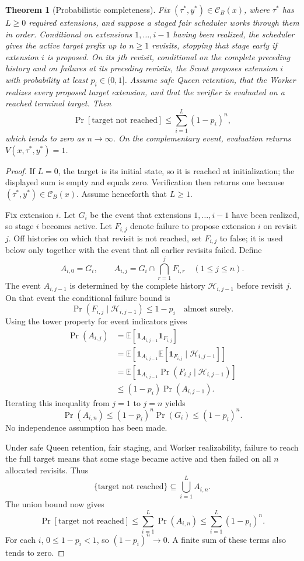 \documentclass[11pt,oneside]{book}
\newtheorem{theorem}[definition]{Theorem}
\theoremstyle{remark}
\newcommand{\cB}{\mathcal C_B}
\newcommand{\one}{\mathbf 1}
\begin{document}
\begin{theorem}[Probabilistic completeness]
Fix $(\tau^*,y^*)\in\cB(x)$, where $\tau^*$ has $L\ge0$ required
extensions, and suppose a staged fair scheduler works through them in order.
Conditional on extensions $1,\ldots,i-1$ having been realized, the scheduler
gives the active target prefix up to $n\ge1$ revisits, stopping that stage
early if extension $i$ is proposed. On its $j$th revisit, conditional on the
complete preceding history and on failures at its preceding revisits, the
Scout proposes extension $i$ with probability at least $p_i\in(0,1]$. Assume
safe Queen retention, that the Worker realizes every proposed target
extension, and that the verifier is evaluated on a reached terminal target.
Then
\[
\Pr[\text{target not reached}]\le\sum_{i=1}^L(1-p_i)^n,
\]
which tends to zero as $n\to\infty$. On the complementary event, evaluation
returns $V(x,\tau^*,y^*)=1$.
\end{theorem}

\begin{proof}
If $L=0$, the target is its initial state, so it is reached at initialization;
the displayed sum is empty and equals zero. Verification then returns one
because $(\tau^*,y^*)\in\cB(x)$. Assume henceforth that $L\ge1$.

Fix extension $i$. Let $G_i$ be the event that extensions
$1,\ldots,i-1$ have been realized, so stage $i$ becomes active. Let
$F_{i,j}$ denote failure to propose extension $i$ on revisit $j$. Off
histories on which that revisit is not reached, set $F_{i,j}$ to false; it is
used below only together with the event that all earlier revisits failed.
Define
\[
A_{i,0}=G_i,
\qquad
A_{i,j}=G_i\cap\bigcap_{r=1}^jF_{i,r}
\quad (1\le j\le n).
\]
The event $A_{i,j-1}$ is determined by the complete history
$\mathcal H_{i,j-1}$ before revisit $j$. On that event the conditional
failure bound is
\[
\Pr(F_{i,j}\mid\mathcal H_{i,j-1})\le1-p_i
\quad\text{almost surely}.
\]
Using the tower property for event indicators gives
\[
\begin{aligned}
\Pr(A_{i,j})
&=\mathbb E\!\left[
\one_{A_{i,j-1}}\one_{F_{i,j}}\right]\\
&=\mathbb E\!\left[
\one_{A_{i,j-1}}
\mathbb E[\one_{F_{i,j}}\mid\mathcal H_{i,j-1}]
\right]\\
&=\mathbb E\!\left[
\one_{A_{i,j-1}}
\Pr(F_{i,j}\mid\mathcal H_{i,j-1})
\right]\\
&\le(1-p_i)\Pr(A_{i,j-1}).
\end{aligned}
\]
Iterating this inequality from $j=1$ to $j=n$ yields
\[
\Pr(A_{i,n})
\le(1-p_i)^n\Pr(G_i)
\le(1-p_i)^n.
\]
No independence assumption has been made.

Under safe Queen retention, fair staging, and Worker realizability, failure to
reach the full target means that some stage became active and then failed on
all $n$ allocated revisits. Thus
\[
\{\text{target not reached}\}
\subseteq\bigcup_{i=1}^L A_{i,n}.
\]
The union bound now gives
\[
\Pr[\text{target not reached}]
\le\sum_{i=1}^L
\Pr(A_{i,n})
\le\sum_{i=1}^L(1-p_i)^n.
\]
For each $i$, $0\le1-p_i<1$, so $(1-p_i)^n\to0$. A finite sum of these terms
also tends to zero.
\end{proof}
\end{document}
